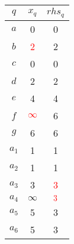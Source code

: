 \begin{center}
\begin{minipage}[t]{.4\linewidth}
\begin{longtable}[c]{| c | c | c |}
     \hline
     $q$ & $x_q$ & $rhs_q$\\
     \hline
     \endfirsthead
     \hline
     \endfoot
     $a$ & 0 & 0\\
     $b$ & \textcolor{red}{2} & 2\\
     $c$ & 0 & 0\\
     $d$ & 2 & 2\\
     $e$ & 4 & 4\\
     $f$ & \textcolor{red}{$\infty$} & 6\\
     $g$ & 6 & 6\\
     $a_1$ & 1 & 1\\
     $a_2$ & 1 & 1\\
     $a_3$ & 3 & \textcolor{red}{3}\\
     $a_4$ & $\infty$ & $\textcolor{red}{3}$\\
     $a_5$ & 5 & 3\\
     $a_6$ & 5 & 3\\
     \hline
\end{longtable}
\end{minipage}
\end{center}